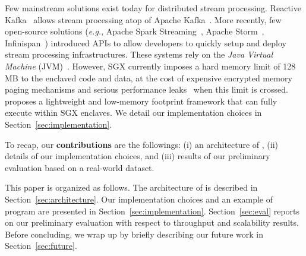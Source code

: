 Few mainstream solutions exist today for distributed stream processing.
Reactive Kafka~\cite{reactivekafka} allows stream processing atop of Apache Kafka~\cite{apachekafka}.
More recently, few open-source solutions (\emph{e.g.}, Apache Spark Streaming~\cite{apachesparkstreaming}, Apache Storm~\cite{apachestorm}, Infinispan~\cite{infinispan}) introduced APIs to allow developers to quickly setup and deploy stream processing infrastructures.
These systems rely on the \emph{Java Virtual Machine} (JVM)~\cite{lindholm2014java}.
However, SGX currently imposes a hard memory limit of 128\,MB to the enclaved code and data, at the cost of expensive encrypted memory paging mechanisms and serious performance leaks~\cite{pires_scbr:2016,brenner_securekeeper:_2016} when this limit is crossed.
\SYS{} proposes a lightweight and low-memory footprint framework that can fully execute within SGX enclaves.
We detail our implementation choices in Section~\ref{sec:implementation}.

To recap, our \textbf{contributions} are the followings: (i) an architecture of \SYS{}, (ii) details of our implementation choices, and (iii) results of our preliminary evaluation based on a real-world dataset.

This paper is organized as follows.
The architecture of \SYS{} is described in Section~\ref{sec:architecture}.
Our implementation choices and an example of \SYS{} program are presented in Section~\ref{sec:implementation}.
Section~\ref{sec:eval} reports on our preliminary evaluation with respect to throughput and scalability results.
Before concluding, we wrap up by briefly describing our future work in Section~\ref{sec:future}.
